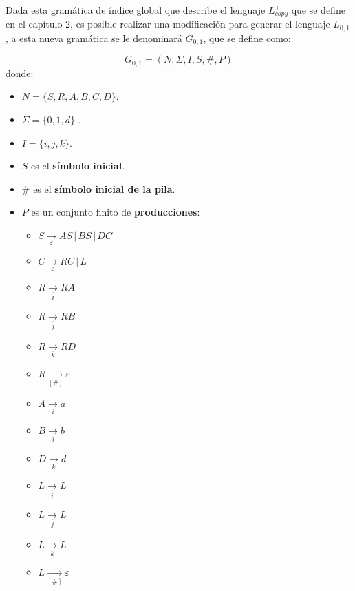 Dada esta gramática de índice global que describe el lenguaje $L_{copy}^+$ que se define en el capítulo 2, es posible realizar una modificación para generar el lenguaje
$L_{0,1}$, a esta nueva gramática se le denominará $G_{0,1}$, que se define como:

$$
    G_{0,1} = (N, \Sigma, I, S, \#, P)
$$
donde:

\begin{itemize}
    \item $N= \{S,R,A,B,C,D\}$.
    \item \( \Sigma=\{0,1,d\} \) .
    \item $I=\{i,j,k\}$.
    \item $S$ es el \textbf{símbolo inicial}.
    \item $\#$ es el \textbf{símbolo inicial de la pila}.
    \item $P$ es un conjunto finito de \textbf{producciones}:
          \begin{multicols}{2}
              \begin{itemize}
                  \item $S\underset{\varepsilon}{\to} AS\,|\,BS\,|\,DC$
                  \item $C\underset{\varepsilon}{\to} RC\,|\,L$
                  \item $R\underset{\overline{i}}{\to} RA$
                  \item $R\underset{\overline{j}}{\to} RB$
                  \item $R\underset{\overline{k}}{\to} RD$

                  \item $R\underset{[\#]}{\to} \varepsilon$
                  \item $A\underset{i}{\to} a$
                  \item $B\underset{j}{\to} b$
                  \item $D\underset{k}{\to} d$
                  \item $L\underset{\overline{i}}{\to} L$
                  \item $L\underset{\overline{j}}{\to} L$
                  \item $L\underset{\overline{k}}{\to} L$
                  \item $L\underset{[\#]}{\to} \varepsilon$
              \end{itemize}
          \end{multicols}
\end{itemize}

